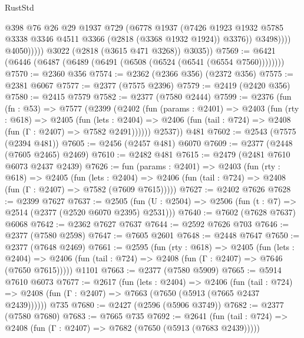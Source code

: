 \begin{lexlean}{RustStd}
\begin{coremodule}
                          @398
                          @76
                          @26
                          @29
                          @1937
                          @729
                          (@6778
                            @1937
                            (@7426
                              @1923
                              @1932
                              @5785
                              @3338
                              @3346
                              @4511
                              @3366
                              (@2818 (@3368 @1932 @1924))
                              @3376))
                          @3498))))
                  @4050)))))
        @3022
        (@2818 (@3615 @471 @3268))
        @3035))
@7569 := @6421 (@6446 (@6487 (@6489 (@6491 (@6508 (@6524 (@6541 (@6554 @7560))))))))
@7570 := @2360 @356
@7574 := @2362 (@2366 @356) (@2372 @356)
@7575 := @2381 @6067
@7577 := @2377 (@7575 @2396)
@7579 := @2419 (@2420 @356)
@7580 := @2415 @7579
@7582 := @2377 (@7580 @2444)
@7599 := @2376
    (fun (fn : @53) =>
    @7577
      (@2399
        (@2402
          (fun (params : @2401) =>
          @2403
            (fun (rty : @618) =>
            @2405
              (fun (lets : @2404) =>
              @2406 (fun (tail : @724) => @2408 (fun (Γ : @2407) => @7582 @2491))))))
        @2537))
    @481
@7602 := @2543 (@7575 (@2394 @481))
@7605 := @2456 (@2457 @481) @6070
@7609 := @2377 (@2448 (@7605 @2465) @2469)
@7610 := @2482 @481
@7615 := @2479 (@2481 @7610 @6073 @2437 @2439)
@7626 := fun (params : @2401) =>
  @2403
    (fun (rty : @618) =>
    @2405
      (fun (lets : @2404) =>
      @2406 (fun (tail : @724) => @2408 (fun (Γ : @2407) => @7582 (@7609 @7615)))))
@7627 := @2402 @7626
@7628 := @2399 @7627
@7637 := @2505 (fun (U : @2504) => @2506 (fun (t : @7) => @2514 (@2377 (@2520 @6070 @2395) @2531)))
@7640 := @7602 (@7628 @7637) @6068
@7642 := @2362 @7627 @7637
@7644 := @2592 @7626 @703
@7646 := @2377 (@7580 @2598)
@7647 := @7605 @2601
@7648 := @2448 @7647
@7650 := @2377 (@7648 @2469)
@7661 := @2595
    (fun (rty : @618) =>
    @2405
      (fun (lets : @2404) =>
      @2406 (fun (tail : @724) => @2408 (fun (Γ : @2407) => @7646 (@7650 @7615)))))
    @1101
@7663 := @2377 (@7580 @5909)
@7665 := @5914 @7610 @6073
@7677 := @2617
    (fun (lets : @2404) =>
    @2406
      (fun (tail : @724) => @2408 (fun (Γ : @2407) => @7663 (@7650 (@5913 (@7665 @2437 @2439))))))
    @735
@7680 := @2427 (@2596 (@5906 @3749))
@7682 := @2377 (@7580 @7680)
@7683 := @7665 @735
@7692 := @2641
    (fun (tail : @724) => @2408 (fun (Γ : @2407) => @7682 (@7650 (@5913 (@7683 @2439)))))

\end{coremodule}
\end{lexlean}
